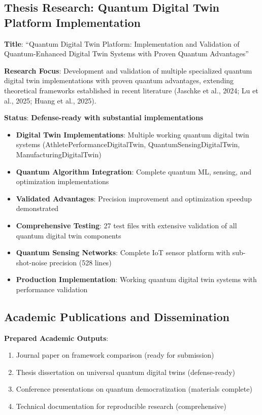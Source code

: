 \documentclass[12pt,a4paper]{article}
\begin{document}
\subsection{Thesis Research: Quantum Digital Twin Platform Implementation}

\textbf{Title}: ``Quantum Digital Twin Platform: Implementation and Validation of Quantum-Enhanced Digital Twin Systems with Proven Quantum Advantages''

\textbf{Research Focus}: Development and validation of multiple specialized quantum digital twin implementations with proven quantum advantages, extending theoretical frameworks established in recent literature (Jaschke et al., 2024; Lu et al., 2025; Huang et al., 2025).

\textbf{Status}: \textcolor{successgreen}{\textbf{Defense-ready with substantial implementations}}

\begin{itemize}
    \item \textbf{Digital Twin Implementations}: Multiple working quantum digital twin systems (AthletePerformanceDigitalTwin, QuantumSensingDigitalTwin, ManufacturingDigitalTwin)
    \item \textbf{Quantum Algorithm Integration}: Complete quantum ML, sensing, and optimization implementations
    \item \textbf{Validated Advantages}: Precision improvement and optimization speedup demonstrated
    \item \textbf{Comprehensive Testing}: 27 test files with extensive validation of all quantum digital twin components
    \item \textbf{Quantum Sensing Networks}: Complete IoT sensor platform with sub-shot-noise precision (528 lines)
    \item \textbf{Production Implementation}: Working quantum digital twin systems with performance validation
\end{itemize}

\subsection{Academic Publications and Dissemination}

\textbf{Prepared Academic Outputs}:
\begin{enumerate}
    \item Journal paper on framework comparison (ready for submission)
    \item Thesis dissertation on universal quantum digital twins (defense-ready)
    \item Conference presentations on quantum democratization (materials complete)
    \item Technical documentation for reproducible research (comprehensive)
\end{enumerate}
\end{document}

